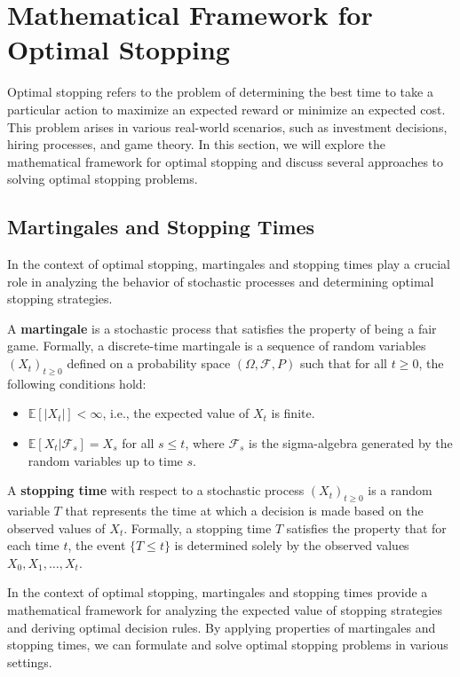 \documentclass[12pt]{book} %
\begin{document}
\section{Mathematical Framework for Optimal Stopping}

Optimal stopping refers to the problem of determining the best time to take a particular action to maximize an expected reward or minimize an expected cost. This problem arises in various real-world scenarios, such as investment decisions, hiring processes, and game theory. In this section, we will explore the mathematical framework for optimal stopping and discuss several approaches to solving optimal stopping problems.

\subsection{Martingales and Stopping Times}

In the context of optimal stopping, martingales and stopping times play a crucial role in analyzing the behavior of stochastic processes and determining optimal stopping strategies.

A \textbf{martingale} is a stochastic process that satisfies the property of being a fair game. Formally, a discrete-time martingale is a sequence of random variables \( (X_t)_{t \geq 0} \) defined on a probability space \( (\Omega, \mathcal{F}, P) \) such that for all \( t \geq 0 \), the following conditions hold:
\begin{itemize}
    \item \( \mathbb{E}[|X_t|] < \infty \), i.e., the expected value of \( X_t \) is finite.
    \item \( \mathbb{E}[X_t | \mathcal{F}_s] = X_s \) for all \( s \leq t \), where \( \mathcal{F}_s \) is the sigma-algebra generated by the random variables up to time \( s \).
\end{itemize}

A \textbf{stopping time} with respect to a stochastic process \( (X_t)_{t \geq 0} \) is a random variable \( T \) that represents the time at which a decision is made based on the observed values of \( X_t \). Formally, a stopping time \( T \) satisfies the property that for each time \( t \), the event \( \{ T \leq t \} \) is determined solely by the observed values \( X_0, X_1, \ldots, X_t \).

In the context of optimal stopping, martingales and stopping times provide a mathematical framework for analyzing the expected value of stopping strategies and deriving optimal decision rules. By applying properties of martingales and stopping times, we can formulate and solve optimal stopping problems in various settings.
\end{document}
